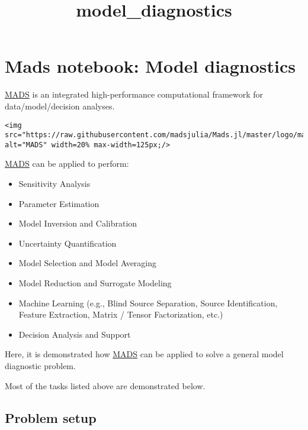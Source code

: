 \documentclass[11pt]{article}
\title{model\_diagnostics}
\providecommand{\tightlist}{%
      \setlength{\itemsep}{0pt}\setlength{\parskip}{0pt}}
\begin{document}
    
    \maketitle
    
    

    
    \hypertarget{mads-notebook-model-diagnostics}{%
\section{Mads notebook: Model
diagnostics}\label{mads-notebook-model-diagnostics}}

\href{http://madsjulia.github.io/Mads.jl}{MADS} is an integrated
high-performance computational framework for data/model/decision
analyses.

\begin{verbatim}
<img src="https://raw.githubusercontent.com/madsjulia/Mads.jl/master/logo/mads_black_swan_logo_big_text_new_3inch.png" alt="MADS" width=20% max-width=125px;/>
\end{verbatim}

\href{http://madsjulia.github.io/Mads.jl}{MADS} can be applied to
perform:

\begin{itemize}
\tightlist
\item
  Sensitivity Analysis
\item
  Parameter Estimation
\item
  Model Inversion and Calibration
\item
  Uncertainty Quantification
\item
  Model Selection and Model Averaging
\item
  Model Reduction and Surrogate Modeling
\item
  Machine Learning (e.g., Blind Source Separation, Source
  Identification, Feature Extraction, Matrix / Tensor Factorization,
  etc.)
\item
  Decision Analysis and Support
\end{itemize}

Here, it is demonstrated how
\href{http://madsjulia.github.io/Mads.jl}{MADS} can be applied to solve
a general model diagnostic problem.

Most of the tasks listed above are demonstrated below.

\hypertarget{problem-setup}{%
\subsection{Problem setup}\label{problem-setup}}
\end{document}
